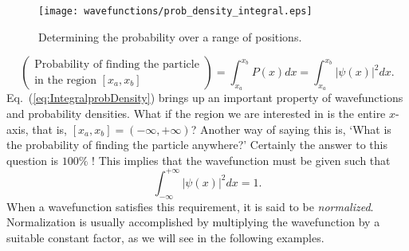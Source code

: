 \begin{figure}[!h]
\begin{center}
\texttt{[image: wavefunctions/prob\_density\_integral.eps]}
\end{center}
\caption{Determining the probability over a range of positions.}
\label{fig:prob_density_integral}
\end{figure}

\begin{equation}
\label{eq:IntegralprobDensity}
\left( \begin{array}{l}
         \mbox{Probability of finding the particle} \\
         \mbox{in the region $[x_a, x_b]$}
                    \end{array} \right) = \int_{x_a}^{x_b} P(x) dx
                                        = \int_{x_a}^{x_b} |\psi(x)|^2 dx .
\end{equation}
Eq.~(\ref{eq:IntegralprobDensity}) brings up an important
property of wavefunctions and probability densities.  What if the
region we are interested in is the entire $x$-axis, that is, 
$[x_a, x_b] = (-\infty, +\infty)$?  
Another way of saying this is, `What is
the probability of finding the particle anywhere?'  Certainly the
answer to this question is $100\%$ !  This implies that the
wavefunction must be given such that
\begin{equation}
\label{eq:normalization}
\int_{-\infty}^{+\infty} |\psi(x)|^2 dx = 1 .
\end{equation}
When a wavefunction satisfies this requirement, it is said to be {\em
  normalized}.  Normalization is usually accomplished by multiplying
the wavefunction by a suitable constant factor, as we will see in the
following examples.


